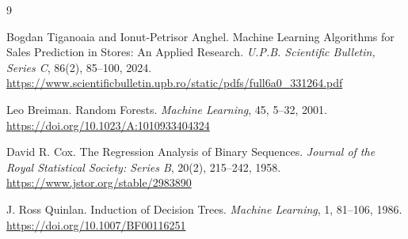 \documentclass{article}
\begin{document}
\begin{thebibliography}{9}

Bogdan Tiganoaia and Ionut-Petrisor Anghel.
\newblock Machine Learning Algorithms for Sales Prediction in Stores: An Applied Research.
\newblock \emph{U.P.B. Scientific Bulletin, Series C}, 86(2), 85--100, 2024.
\newblock \url{https://www.scientificbulletin.upb.ro/static/pdfs/full6a0_331264.pdf}

Leo Breiman.
\newblock Random Forests.
\newblock \emph{Machine Learning}, 45, 5--32, 2001.
\newblock \url{https://doi.org/10.1023/A:1010933404324}

David R. Cox.
\newblock The Regression Analysis of Binary Sequences.
\newblock \emph{Journal of the Royal Statistical Society: Series B}, 20(2), 215--242, 1958.
\newblock \url{https://www.jstor.org/stable/2983890}

J. Ross Quinlan.
\newblock Induction of Decision Trees.
\newblock \emph{Machine Learning}, 1, 81--106, 1986.
\newblock \url{https://doi.org/10.1007/BF00116251}

\end{thebibliography}
\end{document}
